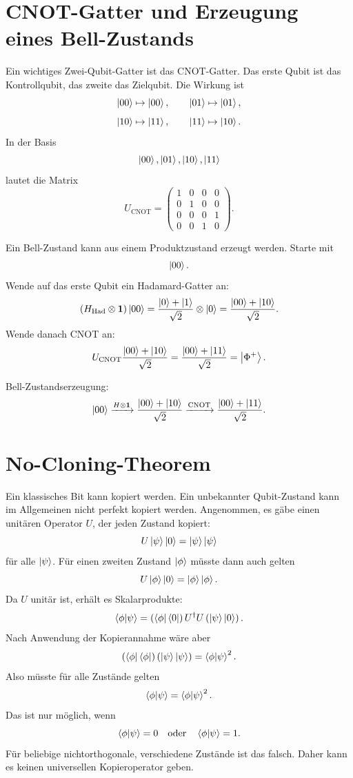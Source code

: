 \section{CNOT-Gatter und Erzeugung eines Bell-Zustands}

Ein wichtiges Zwei-Qubit-Gatter ist das CNOT-Gatter. Das erste Qubit ist das Kontrollqubit, das zweite das Zielqubit. Die Wirkung ist
\[
    \left|00\right\rangle\mapsto\left|00\right\rangle,
    \qquad
    \left|01\right\rangle\mapsto\left|01\right\rangle,
\]
\[
    \left|10\right\rangle\mapsto\left|11\right\rangle,
    \qquad
    \left|11\right\rangle\mapsto\left|10\right\rangle.
\]
In der Basis
\[
    \left|00\right\rangle,\left|01\right\rangle,\left|10\right\rangle,\left|11\right\rangle
\]
lautet die Matrix
\[
    U_{\mathrm{CNOT}}
    =\begin{pmatrix}
        1&0&0&0\\
        0&1&0&0\\
        0&0&0&1\\
        0&0&1&0
    \end{pmatrix}.
\]

Ein Bell-Zustand kann aus einem Produktzustand erzeugt werden. Starte mit
\[
    \left|00\right\rangle.
\]
Wende auf das erste Qubit ein Hadamard-Gatter an:
\[
    (H_{\mathrm{Had}}\otimes\mathbf{1})\left|00\right\rangle
    =\frac{\left|0\right\rangle+\left|1\right\rangle}{\sqrt2}\otimes\left|0\right\rangle
    =\frac{\left|00\right\rangle+\left|10\right\rangle}{\sqrt2}.
\]
Wende danach CNOT an:
\[
    U_{\mathrm{CNOT}}\frac{\left|00\right\rangle+\left|10\right\rangle}{\sqrt2}
    =\frac{\left|00\right\rangle+\left|11\right\rangle}{\sqrt2}
    =\left|\Phi^+\right\rangle.
\]

\begin{formulabox}
Bell-Zustandserzeugung:
\[
    \left|00\right\rangle
    \xrightarrow{H\otimes\mathbf{1}}
    \frac{\left|00\right\rangle+\left|10\right\rangle}{\sqrt2}
    \xrightarrow{\mathrm{CNOT}}
    \frac{\left|00\right\rangle+\left|11\right\rangle}{\sqrt2}.
\]
\end{formulabox}

\section{No-Cloning-Theorem}

Ein klassisches Bit kann kopiert werden. Ein unbekannter Qubit-Zustand kann im Allgemeinen nicht perfekt kopiert werden. Angenommen, es gäbe einen unitären Operator \(U\), der jeden Zustand kopiert:
\[
    U\left|\psi\right\rangle\left|0\right\rangle=\left|\psi\right\rangle\left|\psi\right\rangle
\]
für alle \(\left|\psi\right\rangle\). Für einen zweiten Zustand \(\left|\phi\right\rangle\) müsste dann auch gelten
\[
    U\left|\phi\right\rangle\left|0\right\rangle=\left|\phi\right\rangle\left|\phi\right\rangle.
\]
Da \(U\) unitär ist, erhält es Skalarprodukte:
\[
    \left\langle\phi\middle|\psi\right\rangle
    =\left(\left\langle\phi\right|\left\langle0\right|\right)U^\dagger U\left(\left|\psi\right\rangle\left|0\right\rangle\right).
\]
Nach Anwendung der Kopierannahme wäre aber
\[
    \left(\left\langle\phi\right|\left\langle\phi\right|\right)
    \left(\left|\psi\right\rangle\left|\psi\right\rangle\right)
    =\left\langle\phi\middle|\psi\right\rangle^2.
\]
Also müsste für alle Zustände gelten
\[
    \left\langle\phi\middle|\psi\right\rangle=\left\langle\phi\middle|\psi\right\rangle^2.
\]
Das ist nur möglich, wenn
\[
    \left\langle\phi\middle|\psi\right\rangle=0
    \quad\text{oder}\quad
    \left\langle\phi\middle|\psi\right\rangle=1.
\]
Für beliebige nichtorthogonale, verschiedene Zustände ist das falsch. Daher kann es keinen universellen Kopieroperator geben.

